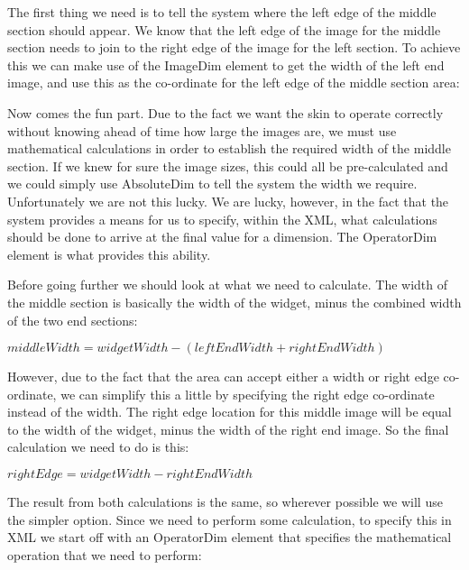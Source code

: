 The first thing we need is to tell the system where the left edge of the middle section should appear. We know that the left edge of the image for the middle section needs to join to the right edge of the image for the left section. To achieve this we can make use of the Image\+Dim element to get the width of the left end image, and use this as the co-\/ordinate for the left edge of the middle section area\+: 
\begin{DoxyCode}{0}
\DoxyCodeLine{    />}
\end{DoxyCode}


Now comes the fun part. Due to the fact we want the skin to operate correctly without knowing ahead of time how large the images are, we must use mathematical calculations in order to establish the required width of the middle section. If we knew for sure the image sizes, this could all be pre-\/calculated and we could simply use Absolute\+Dim to tell the system the width we require. Unfortunately we are not this lucky. We are lucky, however, in the fact that the system provides a means for us to specify, within the X\+ML, what calculations should be done to arrive at the final value for a dimension. The Operator\+Dim element is what provides this ability.

Before going further we should look at what we need to calculate. The width of the middle section is basically the width of the widget, minus the combined width of the two end sections\+:

$ middleWidth=widgetWidth-(leftEndWidth+rightEndWidth) $

However, due to the fact that the area can accept either a width or right edge co-\/ordinate, we can simplify this a little by specifying the right edge co-\/ordinate instead of the width. The right edge location for this middle image will be equal to the width of the widget, minus the width of the right end image. So the final calculation we need to do is this\+:

$ rightEdge=widgetWidth-rightEndWidth $

The result from both calculations is the same, so wherever possible we will use the simpler option. Since we need to perform some calculation, to specify this in X\+ML we start off with an Operator\+Dim element that specifies the mathematical operation that we need to perform\+: 
\begin{DoxyCode}{0}
\DoxyCodeLine{}
\DoxyCodeLine{}
\end{DoxyCode}


